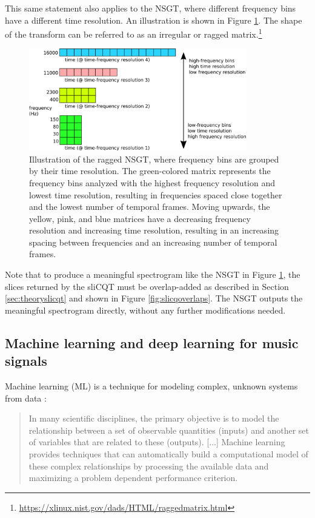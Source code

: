 \documentclass[report.tex]{subfiles}
\begin{document}
This same statement also applies to the NSGT, where different frequency bins have a different time resolution. An illustration is shown in Figure \ref{fig:raggedslicqt}. The shape of the transform can be referred to as an irregular or ragged matrix.\footnote{\url{https://xlinux.nist.gov/dads/HTML/raggedmatrix.html}}

\begin{figure}[ht]
	\centering
	\includegraphics[width=0.8438\textwidth]{./images-misc/slicq_shape.png}
	\caption{Illustration of the ragged NSGT, where frequency bins are grouped by their time resolution. The green-colored matrix represents the frequency bins analyzed with the highest frequency resolution and lowest time resolution, resulting in frequencies spaced close together and the lowest number of temporal frames. Moving upwards, the yellow, pink, and blue matrices have a decreasing frequency resolution and increasing time resolution, resulting in an increasing spacing between frequencies and an increasing number of temporal frames.}
	\label{fig:raggedslicqt}
\end{figure}

Note that to produce a meaningful spectrogram like the NSGT in Figure \ref{fig:raggedslicqt}, the slices returned by the sliCQT must be overlap-added as described in Section \ref{sec:theoryslicqt} and shown in Figure \ref{fig:slicqoverlaps}. The NSGT outputs the meaningful spectrogram directly, without any further modifications needed.

\newpagefill

\subsection{Machine learning and deep learning for music signals}
\label{sec:ml}

Machine learning (ML) is a technique for modeling complex, unknown systems from data \parencite[105]{introtoml}:

\begin{quote}
	In many scientific disciplines, the primary objective is to model the relationship between a set of observable quantities (inputs) and another set of variables that are related to these (outputs). [...] Machine learning provides techniques that can automatically build a computational model of these complex relationships by processing the available data and maximizing a problem dependent performance criterion.
\end{quote}
\end{document}
